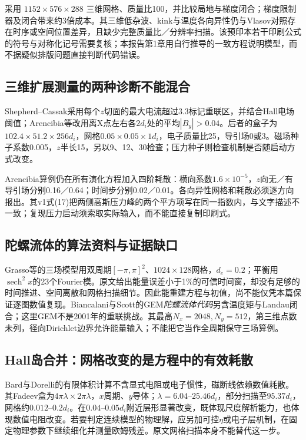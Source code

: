 \documentclass[UTF8,a4paper,11pt,openany,fontset=fandol]{ctexbook}
\begin{document}
\citet{Closure2026}采用 $1152\times576\times288$ 三维网格、质量比100，并比较局地与梯度闭合；梯度限制器及闭合带来约3倍成本。其三维低杂波、kink与温度各向异性仍与Vlasov对照存在时序或空间位置差异，且缺少完整质量比／分辨率扫描。该预印本若干印刷公式的符号与对称化记号需要复核；本报告第1章用自行推导的一致方程说明模型，而不据疑似排版问题直接判断代码错误。

\subsection{三维扩展测量的两种诊断不能混合}
Shepherd--Cassak采用每个$z$切面的最大电流超过$3.3$标记重联区，并结合Hall电场阈值；Arencibia等改用离X点左右各$2d_i$处的平均$|B_y|>0.04$。后者的盒子为$102.4\times51.2\times256d_i$，网格$0.05\times0.05\times1d_i$，电子质量比25，导引场0或3。磁场种子系数0.005，$z$半长15，另以9、12、30检查；压力种子则检查机制是否随启动方式改变。\citep{Shepherd2012,L275}

Arencibia算例仍在所有演化方程加入四阶耗散：横向系数$1.6\times10^{-5}$，$z$向无／有导引场分别0.16／0.64；时间步分别0.02／0.01。各向异性网格和耗散必须逐方向报出。其v1式(17)把两侧高斯压力峰的两个平方项写在同一指数内，与文字描述不一致；复现压力启动须索取实际输入，而不能直接复制印刷式。

\subsection{陀螺流体的算法资料与证据缺口}
Grasso等的三场模型用双周期$[-\pi,\pi]^2$、$1024\times128$网格，$d_e=0.2$；平衡用$\operatorname{sech}^2x$的23个Fourier模。原文给出能量误差小于1\%的可信时间窗，却没有足够的时间推进、空间离散和网格扫描细节。因此能重建方程与初值，尚不能仅凭本篇保证逐图数值复现。Biancalani与Scott的GEM\emph{陀螺流体代码}另含温度矩与Landau闭合；这里GEM不是2001年的重联挑战。其最高$N_x=2048,N_y=512$，第三维点数未列，径向Dirichlet边界允许能量输入；不能把它当作全周期保守三场算例。\citep{E469,L184}

\subsection{Hall岛合并：网格改变的是方程中的有效耗散}
Bard与Dorelli的有限体积计算不含显式电阻或电子惯性，磁断线依赖数值耗散。其Fadeev盒为$4\pi\lambda\times2\pi\lambda$，$x$周期、$y$导体；$\lambda=6.04$--$25.46d_i$，部分扫描至$95.37d_i$，网格约$0.012$--$0.2d_i$。在$0.04$--$0.05d_i$附近层形显著改变，既体现尺度解析能力，也体现数值电阻改变。若要判定连续模型的物理解，应另加可控$\eta$或电子层机制，在固定物理参数下继续细化并测量欧姆残差。原文网格扫描本身不能替代这一步。\citep{L251}
\end{document}
